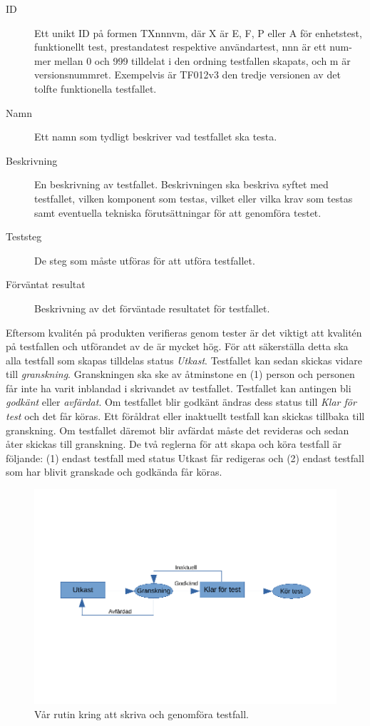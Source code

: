 \documentclass[a4paper]{article}
\begin{document}
\begin{description}
  \item [ID] Ett unikt ID på formen TXnnnvm, där X är E, F, P eller A för enhetstest, funktionellt test, prestandatest respektive användartest, nnn är ett num-mer mellan 0 och 999 tilldelat i den ordning testfallen skapats, och m är versionsnummret. Exempelvis är TF012v3 den tredje versionen av det tolfte funktionella testfallet.
  \item [Namn] Ett namn som tydligt beskriver vad testfallet ska testa.
  \item [Beskrivning] En beskrivning av testfallet. Beskrivningen ska beskriva syftet med testfallet, vilken komponent som testas, vilket eller vilka krav som testas samt eventuella tekniska förutsättningar för att genomföra testet.
  \item [Teststeg] De steg som måste utföras för att utföra testfallet.
  \item [Förväntat resultat] Beskrivning av det förväntade resultatet för testfallet.
\end{description}

Eftersom kvalitén på produkten verifieras genom tester är det viktigt att kvalitén på testfallen och utförandet av de är mycket hög. För att säkerställa detta ska alla testfall som skapas tilldelas status \textit{Utkast}. Testfallet kan sedan skickas vidare till \textit{granskning}. Granskningen ska ske av åtminstone en (1) person och personen får inte ha varit inblandad i skrivandet av testfallet. Testfallet kan antingen bli \textit{godkänt} eller \textit{avfärdat}. Om testfallet blir godkänt ändras dess status till \textit{Klar för test} och det får köras. Ett föråldrat eller inaktuellt testfall kan skickas tillbaka till granskning. Om testfallet däremot blir avfärdat måste det revideras och sedan åter skickas till granskning. De två reglerna för att skapa och köra testfall är följande: (1) endast testfall med status Utkast får redigeras och (2) endast testfall som har blivit granskade och godkända får köras.

\begin{figure}[h]
  \centering
  \includegraphics[trim={0 4cm 0 3cm}, clip, scale=0.8]{figurer/testrutin.pdf}
  \caption{Vår rutin kring att skriva och genomföra testfall.}
\end{figure}
\end{document}
